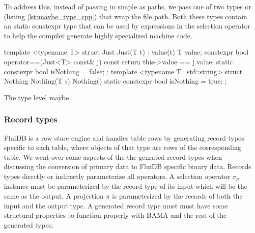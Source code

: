 To address this, instead of passing in simple  as
paths, we pass one of two types  or  (listing
\ref{lst:maybe_type_cpp}) that wrap the file path. Both these types
contain an  static constexpr type that can be used by
 expressions in the selection operator to help
the compiler generate highly specialized machine code.

\begin{code}
\begin{cppcode}
template <typename T>
struct Just {
  Just(T t) : value(t) {}
  T value;
  constexpr bool operator==(Just<T> const& j) const {
    return this->value == j.value;
  }
  static constexpr bool isNothing = false;
};
template <typename T=std::string>
struct Nothing {
  Nothing(T s) {}
  Nothing() {}
  static constexpr bool isNothing = true;
};
\end{cppcode}
\caption{\label{lst:maybe_type_cpp}The type level maybe}
\end{code}

\subsubsection{Record types}

FluiDB is a row store engine and handles table rows by generating
record types specific to each table, where objects of that type are
rows of the corresponding table. We went over some aspects of the the
genrated record types when discussing the conversion of primary data
to FluiDB specific binary data. Records types directly or indirectly
parameterize all operators. A selection operator \(\sigma_p\) instance
must be parameterized by the record type of its input which will be
the same as the output. A projection \(\pi\) is parameterized by the
records of both the input and the output type. A generated record type
must must have some structural properties to function properly with
BAMA and the rest of the generated types:

